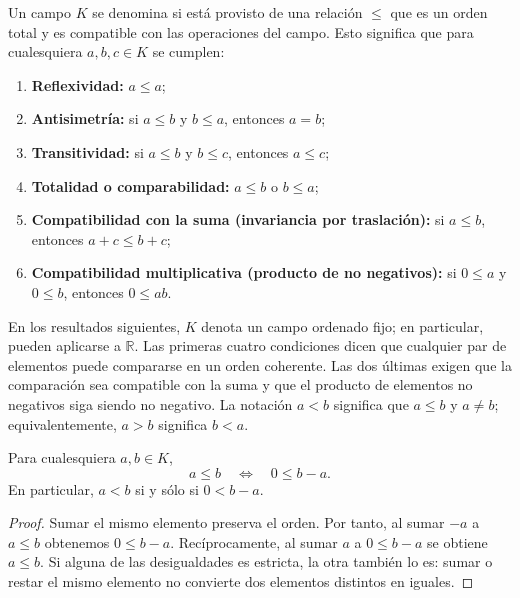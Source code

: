\begin{samepage}
\begin{definition}
\label{def:campo-ordenado}
Un campo $K$ se denomina  si está provisto de una relación $\leq$ que es un orden total y es compatible con las operaciones del campo. Esto significa que para cualesquiera $a,b,c\in K$ se cumplen:
\begin{enumerate}
    \item \textbf{Reflexividad:} $a\leq a$;
    \item \textbf{Antisimetría:} si $a\leq b$ y $b\leq a$, entonces $a=b$;
    \item \textbf{Transitividad:} si $a\leq b$ y $b\leq c$, entonces $a\leq c$;
    \item \textbf{Totalidad o comparabilidad:} $a\leq b$ o $b\leq a$;
    \item \textbf{Compatibilidad con la suma (invariancia por traslación):} si $a\leq b$, entonces $a+c\leq b+c$;
    \item \textbf{Compatibilidad multiplicativa (producto de no negativos):} si $0\leq a$ y $0\leq b$, entonces $0\leq ab$.
\end{enumerate}
\end{definition}
\end{samepage}

En los resultados siguientes, $K$ denota un campo ordenado fijo; en particular, pueden aplicarse a $\mathbb{R}$. Las primeras cuatro condiciones dicen que cualquier par de elementos puede compararse en un orden coherente. Las dos últimas exigen que la comparación sea compatible con la suma y que el producto de elementos no negativos siga siendo no negativo. La notación $a<b$ significa que $a\leq b$ y $a\ne b$; equivalentemente, $a>b$ significa $b<a$.

\begin{samepage}
\begin{proposition}
\label{prop:orden-diferencia}
Para cualesquiera $a,b\in K$,
\[
a\leq b\quad\Longleftrightarrow\quad 0\leq b-a.
\]
En particular, $a<b$ si y sólo si $0<b-a$.
\end{proposition}
\end{samepage}

\begin{proof}
Sumar el mismo elemento preserva el orden. Por tanto, al sumar $-a$ a $a\leq b$ obtenemos $0\leq b-a$. Recíprocamente, al sumar $a$ a $0\leq b-a$ se obtiene $a\leq b$. Si alguna de las desigualdades es estricta, la otra también lo es: sumar o restar el mismo elemento no convierte dos elementos distintos en iguales.
\end{proof}


